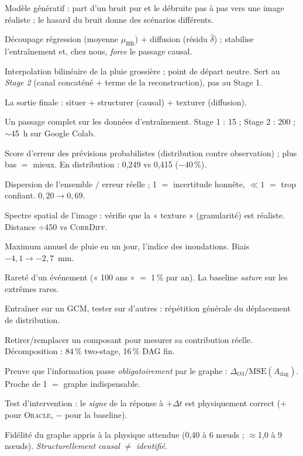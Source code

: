 \documentclass[11pt,a4paper]{article}
\newcommand{\Oracle}{\textsc{Oracle}}
\newcommand{\CorrDiff}{\textsc{CorrDiff}}
\newcommand{\muHR}{\ensuremath{\mu_{\mathrm{HR}}}}
\newcommand{\Adag}{\ensuremath{A_{\mathrm{dag}}}}
\newcommand{\HR}{\ensuremath{\text{HR}}}
\begin{document}
\begin{description}[style=nextline,nosep]
  \item[Diffusion (EDM)] Modèle génératif : part d'un bruit pur et le débruite pas à pas vers une image réaliste ; le hasard du bruit donne des scénarios différents.
  \item[Two-stage] Découpage régression (moyenne \muHR{}) $+$ diffusion (résidu $\widehat{\delta}$) ; stabilise l'entraînement et, chez nous, \emph{force} le passage causal.
  \item[Baseline] Interpolation bilinéaire de la pluie grossière ; point de départ neutre. Sert au \emph{Stage 2} (canal concaténé $+$ terme de la reconstruction), pas au Stage 1.
  \item[$\widehat{x}_{\HR}=\text{baseline}+\muHR+\widehat{\delta}$] La sortie finale : situer $+$ structurer (causal) $+$ texturer (diffusion).
  \item[Époque] Un passage complet sur les données d'entraînement. Stage 1 : 15 ; Stage 2 : 200 ; $\sim$45~h sur Google Colab.
  \item[CRPS] Score d'erreur des prévisions probabilistes (distribution contre observation) ; plus bas $=$ mieux. En distribution : 0,249 vs 0,415 ($-40\,\%$).
  \item[Spread-skill] Dispersion de l'ensemble $/$ erreur réelle ; 1 $=$ incertitude honnête, $\ll 1$ $=$ trop confiant. $0{,}20\to0{,}69$.
  \item[RAPSD] Spectre spatial de l'image : vérifie que la « texture » (granularité) est réaliste. Distance $\div 450$ vs \CorrDiff{}.
  \item[RX1day] Maximum annuel de pluie en un jour, l'indice des inondations. Biais $-4{,}1\to-2{,}7$~mm.
  \item[Période de retour] Rareté d'un événement (« 100 ans » $=$ 1\,\% par an). La baseline \emph{sature} sur les extrêmes rares.
  \item[Inter-GCM] Entraîner sur un GCM, tester sur d'autres : répétition générale du déplacement de distribution.
  \item[Ablation] Retirer/remplacer un composant pour mesurer sa contribution réelle. Décomposition : 84\,\% two-stage, 16\,\% DAG fin.
  \item[O3 (ratio 0{,}87)] Preuve que l'information passe \emph{obligatoirement} par le graphe : $\Delta_{O3}/\mathrm{MSE}(\Adag)$. Proche de 1 $=$ graphe indispensable.
  \item[$Q_{\mathrm{int}}$] Test d'intervention : le \emph{signe} de la réponse à $+\Delta t$ est physiquement correct ($+$ pour \Oracle{}, $-$ pour la baseline).
  \item[$Q_{\mathrm{phys}}$] Fidélité du graphe appris à la physique attendue (0,40 à 6 n\oe uds ; $\approx$1,0 à 9 n\oe uds). \emph{Structurellement causal} $\ne$ \emph{identifié}.
\end{description}
\end{document}
